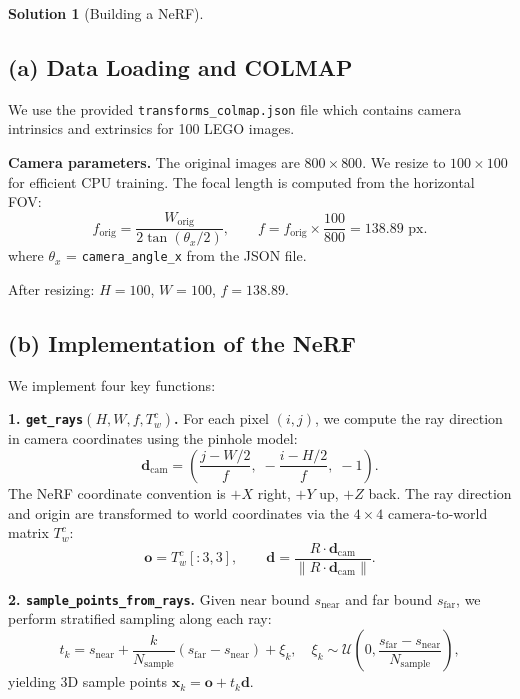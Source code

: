 \documentclass[11pt, reqno, letterpaper, twoside]{amsart}
\theoremstyle{plain}
\theoremstyle{definition}
\newtheorem{solution}[theorem]{Solution}
\begin{document}
\clearpage
\begin{solution}[Building a NeRF]

\subsection*{(a) Data Loading and COLMAP}

We use the provided \texttt{transforms\_colmap.json} file which contains camera intrinsics and extrinsics for 100 LEGO images.

\medskip
\noindent\textbf{Camera parameters.}
The original images are $800 \times 800$.  We resize to $100 \times 100$ for efficient CPU training.  The focal length is computed from the horizontal FOV:
\[
  f_{\text{orig}} = \frac{W_{\text{orig}}}{2 \tan(\theta_x / 2)}, \qquad
  f = f_{\text{orig}} \times \frac{100}{800} = 138.89 \text{ px}.
\]
where $\theta_x$ = \texttt{camera\_angle\_x} from the JSON file.

After resizing: $H = 100$, $W = 100$, $f = 138.89$.

\subsection*{(b) Implementation of the NeRF}

We implement four key functions:

\medskip
\noindent\textbf{1. \texttt{get\_rays}$(H, W, f, T_w^c)$.}
For each pixel $(i,j)$, we compute the ray direction in camera coordinates using the pinhole model:
\[
  \mathbf{d}_{\text{cam}} = \left( \frac{j - W/2}{f}, \; -\frac{i - H/2}{f}, \; -1 \right).
\]
The NeRF coordinate convention is $+X$ right, $+Y$ up, $+Z$ back.  The ray direction and origin are transformed to world coordinates via the $4 \times 4$ camera-to-world matrix $T_w^c$:
\[
  \mathbf{o} = T_w^c[:3, 3], \qquad
  \mathbf{d} = \frac{R \cdot \mathbf{d}_{\text{cam}}}{\|R \cdot \mathbf{d}_{\text{cam}}\|}.
\]

\medskip
\noindent\textbf{2. \texttt{sample\_points\_from\_rays}.}
Given near bound $s_{\text{near}}$ and far bound $s_{\text{far}}$, we perform stratified sampling along each ray:
\[
  t_k = s_{\text{near}} + \frac{k}{N_{\text{sample}}} (s_{\text{far}} - s_{\text{near}}) + \xi_k, \quad \xi_k \sim \mathcal{U}\!\left(0, \frac{s_{\text{far}} - s_{\text{near}}}{N_{\text{sample}}}\right),
\]
yielding 3D sample points $\mathbf{x}_k = \mathbf{o} + t_k \mathbf{d}$.


\end{solution}
\end{document}
